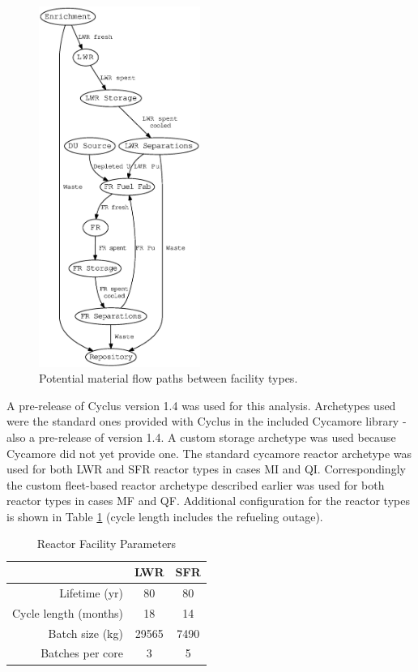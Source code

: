 \documentclass{style}
\begin{document}
\begin{figure}[!h]
    \centering
    \includegraphics[width=0.47\textwidth]{exp2/flow.eps}
    \caption[Material flow paths]{Potential material flow paths between facility types.}
    \label{fig:flow}
\end{figure}

A pre-release of Cyclus version 1.4 was used for this analysis.  Archetypes
used were the standard ones provided with Cyclus in the included Cycamore
library - also a pre-release of version 1.4.  A custom storage archetype was
used because Cycamore did not yet provide one.  The standard cycamore reactor archetype
was used for both LWR and SFR reactor types in cases MI and QI.  Correspondingly
the custom fleet-based reactor archetype described earlier was used for both reactor
types in cases MF and QF.  Additional configuration for the reactor types is
shown in Table \ref{tab:reactors} (cycle length includes the refueling outage).

\vspace{2mm}

\begin{table}[h]
    \caption{Reactor Facility Parameters}
    \centering
    \begin{tabular}{ |r | c c | }
        \hline                       
            & LWR & SFR \\
        \hline                       
        Lifetime (yr)         & 80 & 80 \\
        Cycle length (months) & 18 & 14 \\
        Batch size (kg)       & 29565 & 7490 \\
        Batches per core      & 3 & 5 \\
        \hline                       
    \end{tabular}
    \captionsetup{justification=centering}
    \label{tab:reactors}
\end{table}
\end{document}
